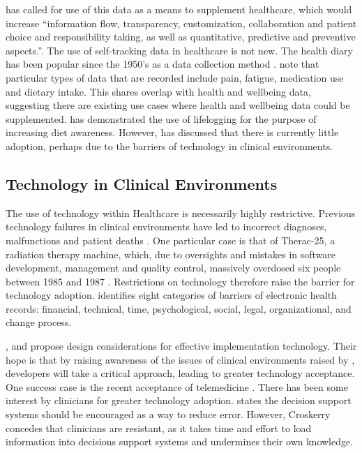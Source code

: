 \documentclass{sigchi}
\begin{document}
\cite{Swan2009} has called for use of this data as a means to supplement healthcare, which would increase ``information flow, transparency, customization, collaboration and patient choice and responsibility taking, as well as quantitative, predictive and preventive aspects.''. The use of self-tracking data in healthcare is not new. The health diary has been popular since the 1950's as a data collection method \cite{Richardson1994}.  \cite{Richardson1994} note that particular types of data that are recorded include pain, fatigue, medication use and dietary intake. This shares overlap with health and wellbeing data, suggesting there are existing use cases where health and wellbeing data could be supplemented. \cite{OLoughlin2013} has demonstrated the use of lifelogging for the purpose of increasing diet awareness. However, \cite{Swan2009} has discussed that there is currently little adoption, perhaps due to the barriers of technology in clinical environments.

\subsection{Technology in Clinical Environments}
The use of technology within Healthcare is necessarily highly restrictive. Previous technology failures in clinical environments have led to incorrect diagnoses, malfunctions and patient deaths \cite{Leveson1993}. One particular case is that of Therac-25, a radiation therapy machine, which, due to oversights and mistakes in software development, management and quality control, massively overdosed six people between 1985 and 1987 \cite{Leveson1993}. Restrictions on technology therefore raise the barrier for technology adoption. \cite{Boonstra2010} identifies eight categories of barriers of electronic health records: financial, technical, time, psychological, social, legal, organizational, and change process.

\cite{Beuscart-Zephir1997}, \cite{Ovretveit2007} and \cite{Taneva2014} propose design considerations for effective implementation technology. Their hope is that by raising awareness of the issues of clinical environments raised by \cite{Boonstra2010}, developers will take a critical approach, leading to greater technology acceptance. One success case is the recent acceptance of telemedicine \cite{Chau2002}. There has been some interest by clinicians for greater technology adoption. \cite{Croskerry2013a} states the decision support systems should be encouraged as a way to reduce error. However, Croskerry concedes that clinicians are resistant, as it takes time and effort to load information into decisions support systems and undermines their own knowledge.
\end{document}
